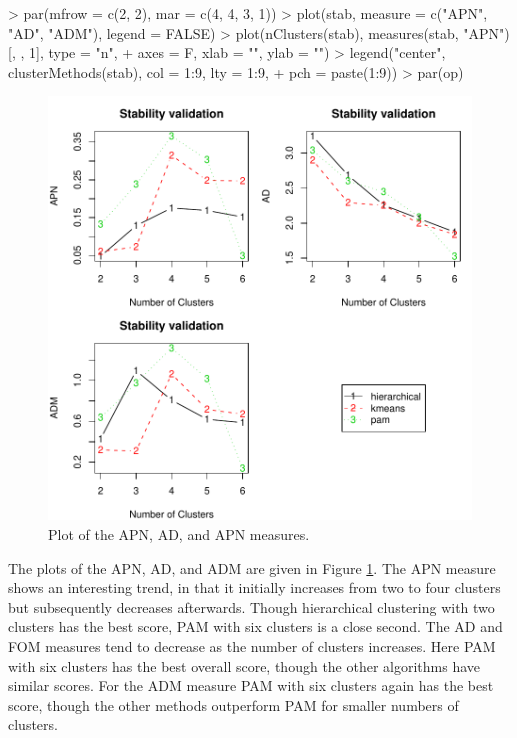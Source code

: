 \documentclass[11pt]{article}
\begin{document}


\begin{Schunk}
\begin{Sinput}
> par(mfrow = c(2, 2), mar = c(4, 4, 3, 1))
> plot(stab, measure = c("APN", "AD", "ADM"), legend = FALSE)
> plot(nClusters(stab), measures(stab, "APN")[, , 1], type = "n", 
+     axes = F, xlab = "", ylab = "")
> legend("center", clusterMethods(stab), col = 1:9, lty = 1:9, 
+     pch = paste(1:9))
> par(op)
\end{Sinput}
\end{Schunk}

\begin{figure}
  \centering
\includegraphics{clValid-010}
  \caption{Plot of the APN, AD, and APN  measures.}
  \label{fig:stabPlot}
\end{figure}



The plots of the APN, AD, and ADM are given in Figure
\ref{fig:stabPlot}.
The APN measure shows an interesting
trend, in that it initially increases
from two to four clusters but subsequently decreases afterwards.  
Though hierarchical clustering with two clusters has the best score,
PAM with six clusters is a close second.
The AD and FOM measures tend to decrease as the number of clusters
increases.  Here PAM with six clusters has the best overall score,
though the other algorithms have similar scores.
For the ADM measure PAM with six clusters again has the best score,
though the other methods outperform PAM for smaller numbers of clusters.
\end{document}
